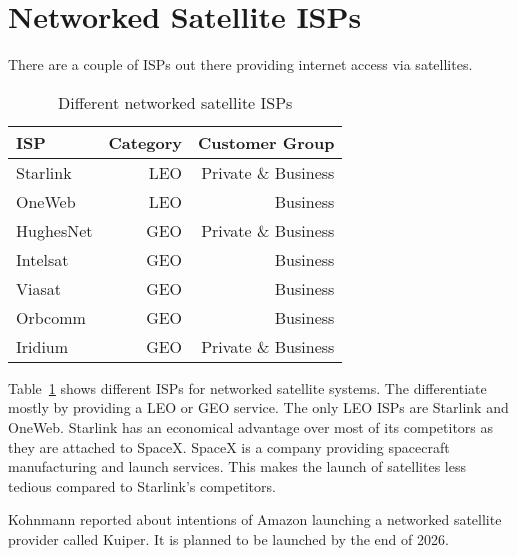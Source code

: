 \section{Networked Satellite ISPs} \label{sec>isps}

There are a couple of ISPs out there providing internet access via satellites.

\begin{table}[]
	\caption{Different networked satellite ISPs}
	\label{fig:satellite-isp}
	\begin{tabular}{lrr}
		\toprule
		ISP       & Category & Customer Group      \\
		\midrule
		Starlink  & LEO      & Private \& Business \\
		OneWeb    & LEO      & Business            \\
		HughesNet & GEO      & Private \& Business \\
		Intelsat  & GEO      & Business            \\
		Viasat    & GEO      & Business            \\
		Orbcomm   & GEO      & Business            \\
		Iridium   & GEO      & Private \& Business \\
		\bottomrule
	\end{tabular}
\end{table}

Table~\ref{fig:satellite-isp} shows different ISPs for networked satellite systems.
The differentiate mostly by providing a \ac{LEO} or \ac{GEO} service. The only \ac{LEO}
ISPs are Starlink and OneWeb. Starlink has an economical advantage over most of its competitors
as they are attached to SpaceX. SpaceX is a company providing spacecraft manufacturing and launch services.
This makes the launch of satellites less tedious compared to Starlink's competitors.

Kohnmann \cite{Kohnmann24} reported about intentions of Amazon launching a networked satellite provider called Kuiper. It is planned to be launched by the end of 2026.
